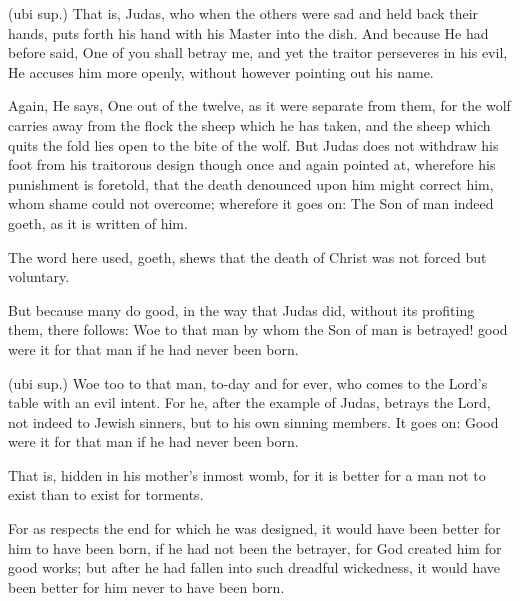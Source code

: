  (ubi sup.) That is, Judas, who when the others were sad and held back their hands, puts forth his hand with his Master into the dish. And because He had before said, One of you shall betray me, and yet the traitor perseveres in his evil, He accuses him more openly, without however pointing out his name.

 Again, He says, One out of the twelve, as it were separate from them, for the wolf carries away from the flock the sheep which he has taken, and the sheep which quits the fold lies open to the bite of the wolf. But Judas does not withdraw his foot from his traitorous design though once and again pointed at, wherefore his punishment is foretold, that the death denounced upon him might correct him, whom shame could not overcome; wherefore it goes on: The Son of man indeed goeth, as it is written of him.

 The word here used, goeth, shews that the death of Christ was not forced but voluntary.

 But because many do good, in the way that Judas did, without its profiting them, there follows: Woe to that man by whom the Son of man is betrayed! good were it for that man if he had never been born.

 (ubi sup.) Woe too to that man, to-day and for ever, who comes to the Lord’s table with an evil intent. For he, after the example of Judas, betrays the Lord, not indeed to Jewish sinners, but to his own sinning members. It goes on: Good were it for that man if he had never been born.

 That is, hidden in his mother’s inmost womb, for it is better for a man not to exist than to exist for torments.

 For as respects the end for which he was designed, it would have been better for him to have been born, if he had not been the betrayer, for God created him for good works; but after he had fallen into such dreadful wickedness, it would have been better for him never to have been born.

 

